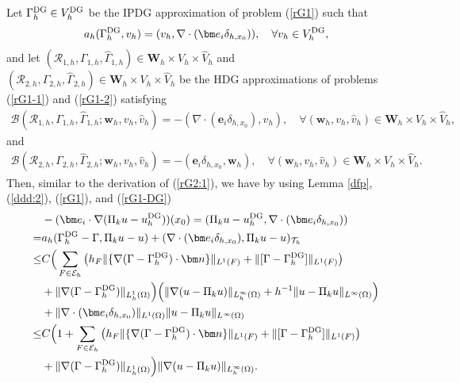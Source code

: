 \documentclass[1996/10/24]{amsart}
\theoremstyle{definition}
\numberwithin{equation}{section}
\begin{document}
Let $\Gamma_h^{{\rm DG}}\in V_h^{{\rm DG}}$ be the IPDG approximation of problem (\ref{rG1}) such that
\begin{align}
a_h(\Gamma_h^{{\rm DG}},v_h)=(v_h,\nabla\cdot({\bm e}_i\delta_{h,x_0})),\quad \forall v_h\in V_h^{{\rm DG}},\label{rG1-DG}
\end{align}
and let $(\boldsymbol{\mathcal{R}}_{1,h},\Gamma_{1,h},\widehat{\Gamma}_{1,h})\in {\bm W}_h\times V_h\times \widehat{V}_h$ and $(\boldsymbol{\mathcal{R}}_{2,h},\Gamma_{2,h},\widehat{\Gamma}_{2,h})\in {\bm W}_h\times V_h\times \widehat{V}_h$ be the HDG approximations of problems
(\ref{rG1-1}) and (\ref{rG1-2}) satisfying
\begin{align}
\mathcal{B}(\boldsymbol{\mathcal{R}}_{1,h},\Gamma_{1,h},\widehat{\Gamma}_{1,h};{\bm w}_h,v_h,\widehat{v}_h)=-(\nabla\cdot({\bm e}_i\delta_{h,x_0}),v_h),\quad \forall ({\bm w}_h,v_h,\widehat{v}_h)\in {\bm W}_h\times V_h\times \widehat{V}_h,\label{rG1-1-HDG}
\end{align}
and
\begin{align}
\mathcal{B}(\boldsymbol{\mathcal{R}}_{2,h},\Gamma_{2,h},\widehat{\Gamma}_{2,h};{\bm w}_h,v_h,\widehat{v}_h)=-({\bm e}_i\delta_{h,x_0},{\bm w}_h),\quad \forall ({\bm w}_h,v_h,\widehat{v}_h)\in{\bm W}_h\times V_h\times \widehat{V}_h.\label{rG1-2-HDG}
\end{align}
Then, similar to the derivation of (\ref{rG2:1}), we have by using Lemma \ref{dfp}, (\ref{ddd:2}), (\ref{rG1}), and (\ref{rG1-DG})
\begin{align}
&-({\bm e}_i\cdot\nabla(\Pi_ku-u_h^{{\rm DG}}))(x_0)=(\Pi_ku-u_h^{{\rm DG}}, \nabla\cdot({\bm e}_i\delta_{h,x_0}))\nonumber\\
=&a_h(\Gamma_h^{{\rm DG}}-\Gamma,\Pi_ku-u)+(\nabla\cdot({\bm e}_i\delta_{h,x_0}),\Pi_ku-u)_{\mathcal{T}_h}\nonumber\\
\leq&C\Big(\sum_{F\in\mathcal{E}_h}\left(h_F\|\{\nabla(\Gamma-\Gamma_h^{{\rm DG}})\cdot{\bm n}\}\|_{L^1(F)}+\|[\Gamma-\Gamma_h^{{\rm DG}}]\|_{L^1(F)}\right)\nonumber\\
&+\|\nabla(\Gamma-\Gamma_h^{{\rm DG}})\|_{L_h^1(\Omega)}\Big)\Big(\|\nabla(u-\Pi_ku)\|_{L_h^{\infty}(\Omega)}+h^{-1}\|u-\Pi_ku\|_{L^{\infty}(\Omega)}\Big)\label{rG1:1}\\
&+\|\nabla\cdot({\bm e}_i\delta_{h,x_0})\|_{L^1(\Omega)}\|u-\Pi_ku\|_{L^{\infty}(\Omega)}\nonumber\\
\leq&C\Big(1+\sum_{F\in\mathcal{E}_h}\left(h_F\|\{\nabla(\Gamma-\Gamma_h^{{\rm DG}})\cdot{\bm n}\}\|_{L^1(F)}+\|[\Gamma-\Gamma_h^{{\rm DG}}]\|_{L^1(F)}\right)\nonumber\\
&+\|\nabla(\Gamma-\Gamma_h^{{\rm DG}})\|_{L_h^1(\Omega)}\Big)\|\nabla(u-\Pi_ku)\|_{L_h^{\infty}(\Omega)}.\nonumber
\end{align}
\end{document}
